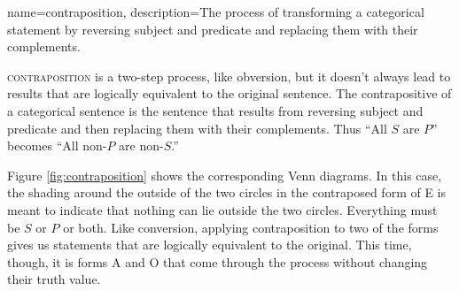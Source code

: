 {
name=contraposition,
description={The process of transforming a categorical statement by reversing subject and predicate and replacing them with their complements.}
}


\textsc{\gls{contraposition}} is a two-step process, like obversion, but it doesn't always lead to results that are logically equivalent to the original sentence. The contrapositive of a categorical sentence is the sentence that results from reversing subject and predicate and then replacing them with their complements. Thus ``All $S$ are $P$'' becomes ``All non-$P$ are non-$S$.'' 

Figure \ref{fig:contraposition} shows the corresponding Venn diagrams. In this case, the shading around the outside of the two circles in the contraposed form of E is meant to indicate that nothing can lie outside the two circles. Everything must be $S$ or $P$ or both. Like conversion, applying contraposition to two of the forms gives us statements that are logically equivalent to the original. This time, though, it is forms A and O that come through the process without changing their truth value. 

